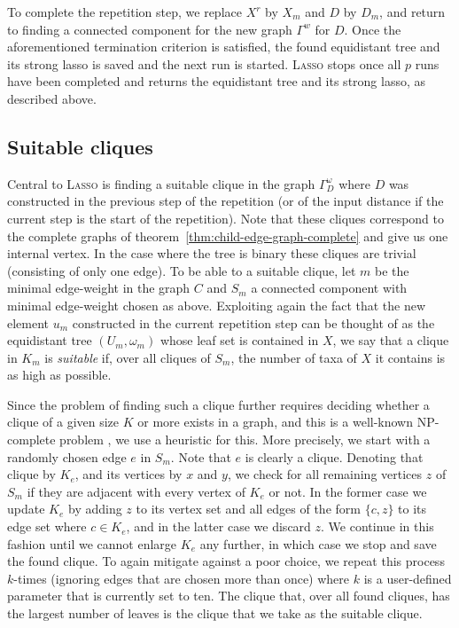 To complete the repetition step, we replace $X^r$ by $X_m$ and $D$ by $D_m$,
and return to finding a connected component for the new graph $\Gamma^w$ for
$D$. Once the aforementioned termination criterion is satisfied, the found
equidistant tree and its strong lasso is saved and the next run is
started. \textsc{Lasso} stops once all $p$ runs have been completed and returns
the equidistant tree and its strong lasso, as described above.

\subsection{Suitable cliques}
\label{sec:cliques}

Central to \textsc{Lasso} is finding a suitable clique in the graph
$\Gamma^{\omega}_D$ where $D$ was constructed in the previous step of the
repetition (or of the input distance if the current step is the start of the
repetition). Note that these cliques correspond to the complete graphs of
theorem~\ref{thm:child-edge-graph-complete} and give us one internal vertex.
In the case where the tree is binary these cliques are trivial (consisting of
only one edge).  To be able to a suitable clique, let $m$ be the minimal
edge-weight in the graph $C$ and $S_m$ a connected component with minimal
edge-weight chosen as above.  Exploiting again the fact that the new element
$u_m$ constructed in the current repetition step can be thought of as the
equidistant tree $(U_m,\omega_m)$ whose leaf set is contained in $X$, we say
that a clique in $K_m$ is {\em suitable} if, over all cliques of $S_m$, the
number of taxa of $X$ it contains is as high as possible.

Since the problem of finding such a clique further requires deciding whether a
clique of a given size $K$ or more exists in a graph, and this is a well-known
NP-complete problem \cite{gareyjohnson79}, we use a heuristic for this. More
precisely, we start with a randomly chosen edge $e$ in $S_m$. Note that $e$ is
clearly a clique. Denoting that clique by $K_e$, and its vertices by $x$ and
$y$, we check for all remaining vertices $z$ of $S_m$ if they are adjacent
with every vertex of $K_e$ or not. In the former case we update $K_e$ by
adding $z$ to its vertex set and all edges of the form $\{c,z\}$ to its edge
set where $c\in K_e$, and in the latter case we discard $z$.  We continue in
this fashion until we cannot enlarge $K_e$ any further, in which case we stop
and save the found clique. To again mitigate against a poor choice, we repeat
this process $k$-times (ignoring edges that are chosen more than once) where
$k$ is a user-defined parameter that is currently set to ten. The clique that,
over all found cliques, has the largest number of leaves is the clique that we
take as the suitable clique.

